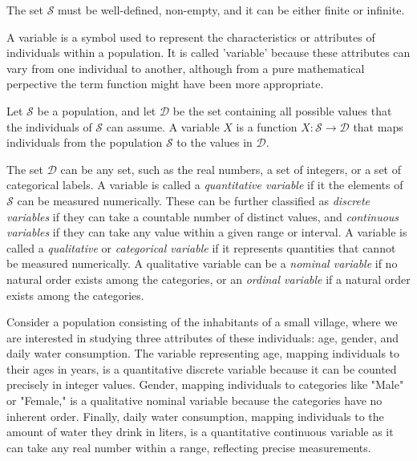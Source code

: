 The set $\mathcal{S}$ must be well-defined, non-empty, and it can be either finite or infinite. 

A variable is a symbol used to represent the characteristics or attributes of individuals within a population. It is called 'variable' because these attributes can vary from one individual to another, although from a pure mathematical perpective the term function might have been more appropriate.

\begin{definition}
Let $\mathcal{S}$ be a population, and let $\mathcal{D}$ be the set containing all possible values that the individuals of $\mathcal{S}$ can assume. A variable $X$ is a function $X: \mathcal{S} \rightarrow \mathcal{D}$ that maps individuals from the population $\mathcal{S}$ to the values in $\mathcal{D}$.
\end{definition}

The set $\mathcal{D}$ can be any set, such as the real numbers, a set of integers, or a set of categorical labels. A variable is called a \emph{quantitative variable} if it the elements of $\mathcal{S}$ can be measured numerically. These can be further classified as \emph{discrete variables} if they can take a countable number of distinct values, and \emph{continuous variables} if they can take any value within a given range or interval. A variable is called a \emph{qualitative} or \emph{categorical variable} if it represents quantities that cannot be measured numerically. A qualitative variable can be a \emph{nominal variable} if no natural order exists among the categories, or an \emph{ordinal variable} if a natural order exists among the categories.

\begin{example}
Consider a population consisting of the inhabitants of a small village, where we are interested in studying three attributes of these individuals: age, gender, and daily water consumption. The variable representing age, mapping individuals to their ages in years, is a quantitative discrete variable because it can be counted precisely in integer values. Gender, mapping individuals to categories like "Male" or "Female," is a qualitative nominal variable because the categories have no inherent order. Finally, daily water consumption, mapping individuals to the amount of water they drink in liters, is a quantitative continuous variable as it can take any real number within a range, reflecting precise measurements.
\end{example}

